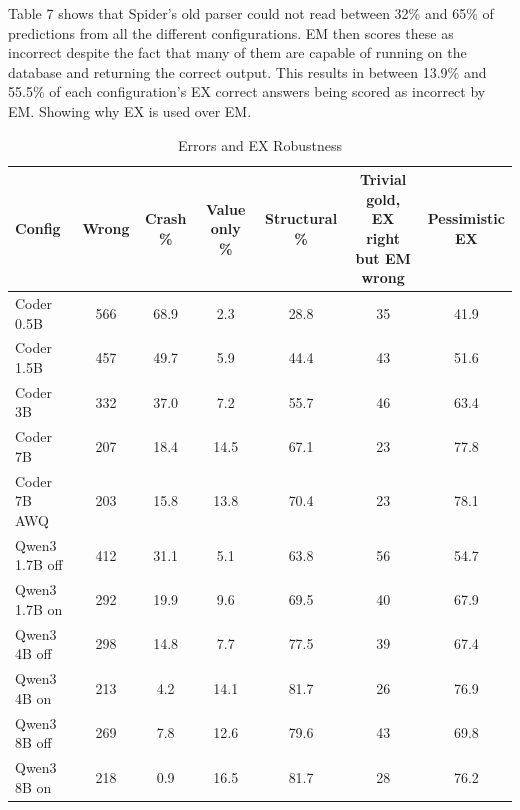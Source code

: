 Table 7 shows that Spider's old parser could not read between 32\% and 65\% of predictions from all the different configurations. EM then scores these as incorrect despite the fact that many of them are capable of running on the database and returning the correct output. This results in between 13.9\% and 55.5\% of each configuration's EX correct answers being scored as incorrect by EM. Showing why EX is used over EM.

\begin{table}[!htbp]
\centering
\caption{Errors and EX Robustness}
\label{tab:8}
\small
\begin{adjustbox}{max width=\linewidth}
\begin{tabular}{@{}lcccccc@{}}
\toprule
Config & Wrong & Crash \% & Value only \% & Structural \% & \makecell{Trivial gold, EX \\ {}right but EM wrong} & \makecell{Pessimistic \\ {}EX} \\
\midrule
Coder 0.5B & 566 & 68.9 & 2.3 & 28.8 & 35 & 41.9 \\
Coder 1.5B & 457 & 49.7 & 5.9 & 44.4 & 43 & 51.6 \\
Coder 3B & 332 & 37.0 & 7.2 & 55.7 & 46 & 63.4 \\
Coder 7B & 207 & 18.4 & 14.5 & 67.1 & 23 & 77.8 \\
Coder 7B AWQ & 203 & 15.8 & 13.8 & 70.4 & 23 & 78.1 \\
Qwen3 1.7B off & 412 & 31.1 & 5.1 & 63.8 & 56 & 54.7 \\
Qwen3 1.7B on & 292 & 19.9 & 9.6 & 69.5 & 40 & 67.9 \\
Qwen3 4B off & 298 & 14.8 & 7.7 & 77.5 & 39 & 67.4 \\
Qwen3 4B on & 213 & 4.2 & 14.1 & 81.7 & 26 & 76.9 \\
Qwen3 8B off & 269 & 7.8 & 12.6 & 79.6 & 43 & 69.8 \\
Qwen3 8B on & 218 & 0.9 & 16.5 & 81.7 & 28 & 76.2 \\
\bottomrule
\end{tabular}
\end{adjustbox}
\par{}
\end{table}

